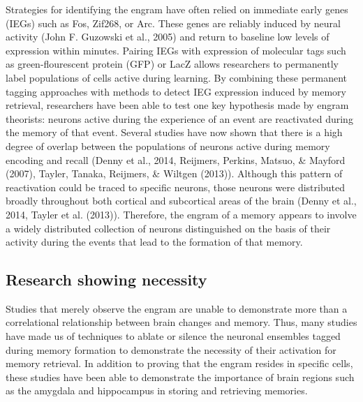 \documentclass[12pt,a4paperpaper,]{report}
\begin{document}
Strategies for identifying the engram have often relied on immediate
early genes (IEGs) such as Fos, Zif268, or Arc. These genes are reliably
induced by neural activity (John F. Guzowski et al., 2005) and return to
baseline low levels of expression within minutes. Pairing IEGs with
expression of molecular tags such as green-flourescent protein (GFP) or
LacZ allows researchers to permanently label populations of cells active
during learning. By combining these permanent tagging approaches with
methods to detect IEG expression induced by memory retrieval,
researchers have been able to test one key hypothesis made by engram
theorists: neurons active during the experience of an event are
reactivated during the memory of that event. Several studies have now
shown that there is a high degree of overlap between the populations of
neurons active during memory encoding and recall (Denny et al., 2014,
Reijmers, Perkins, Matsuo, \& Mayford (2007), Tayler, Tanaka, Reijmers,
\& Wiltgen (2013)). Although this pattern of reactivation could be
traced to specific neurons, those neurons were distributed broadly
throughout both cortical and subcortical areas of the brain (Denny et
al., 2014, Tayler et al. (2013)). Therefore, the engram of a memory
appears to involve a widely distributed collection of neurons
distinguished on the basis of their activity during the events that lead
to the formation of that memory.

\subsection{Research showing
necessity}\label{research-showing-necessity}

Studies that merely observe the engram are unable to demonstrate more
than a correlational relationship between brain changes and memory.
Thus, many studies have made us of techniques to ablate or silence the
neuronal ensembles tagged during memory formation to demonstrate the
necessity of their activation for memory retrieval. In addition to
proving that the engram resides in specific cells, these studies have
been able to demonstrate the importance of brain regions such as the
amygdala and hippocampus in storing and retrieving memories.
\end{document}
